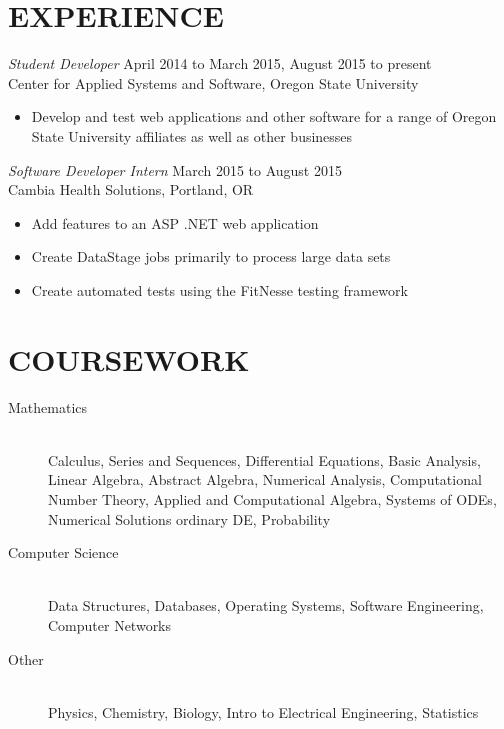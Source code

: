 \documentclass[margin]{res}
\begin{document}
\begin{resume}
\section{EXPERIENCE} {\sl Student Developer} \hfill April 2014 to                  March 2015, August 2015 to present \\
                Center for Applied Systems and Software, Oregon State University
                 \begin{itemize}  \itemsep -2pt %
                 \item Develop and test web applications and other software for a range of Oregon State University affiliates as well as other businesses


                \end{itemize}
 
                {\sl Software Developer Intern} \hfill            March 2015 to August 2015 \\
                Cambia Health Solutions, Portland, OR 
                 \begin{itemize}  \itemsep -2pt %
                 \item Add features to an ASP .NET web application
                 \item Create DataStage jobs primarily to process large data sets
                 \item Create automated tests using the FitNesse testing framework
                 \end{itemize} 
                   
\section{COURSEWORK}
    \begin{description}
                  \item[Mathematics] \hfill \\
                  Calculus, Series and Sequences, Differential Equations, Basic Analysis, Linear Algebra, Abstract Algebra, Numerical Analysis, Computational Number Theory, Applied and Computational Algebra, Systems of ODEs, Numerical Solutions ordinary DE, Probability
                  \item[Computer Science] \hfill \\
                  Data Structures, Databases, Operating Systems, Software Engineering, Computer Networks
                  \item[Other] \hfill \\
                  Physics, Chemistry, Biology, Intro to Electrical Engineering, Statistics
                \end{description}


\end{resume}
\end{document}
